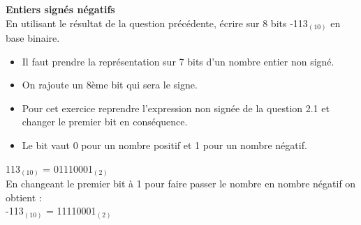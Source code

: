 \begin{Exercice}[15 minutes] \textbf{Entiers signés négatifs}\\
    En utilisant le résultat de la question précédente, écrire sur 8 bits -113$_{(10)}$ en base binaire. \\

    \begin{conseil}
        \begin{itemize}
        	\item Il faut prendre la représentation sur 7 bits d'un nombre entier non signé.
        	\item On rajoute un 8ème bit qui sera le signe.
        	\item Pour cet exercice reprendre l'expression non signée de la question 2.1 et changer le premier bit en conséquence.
        	\item Le bit vaut 0 pour un nombre positif et 1 pour un nombre négatif.
        \end{itemize} 
    \end{conseil}
    
    \begin{solution}
         113$_{(10)}$ = 01110001$_{(2)}$ \\
         
         En changeant le premier bit à 1 pour faire passer le nombre en nombre négatif on obtient : \\
         
         -113$_{(10)}$ = 11110001$_{(2)}$ \\
    \end{solution}
\end{Exercice}

